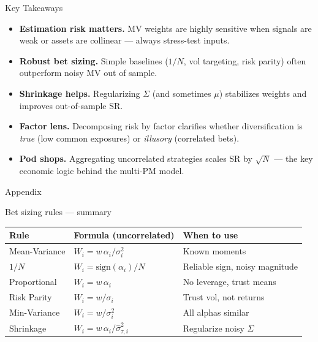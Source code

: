 \documentclass[aspectratio=169,10pt]{beamer}
\begin{document}

\begin{frame}{Key Takeaways}

\begin{itemize}
\item \textbf{Estimation risk matters.} MV weights are highly sensitive when signals are weak or assets are collinear --- always stress-test inputs.
\vskip 6pt
\item \textbf{Robust bet sizing.} Simple baselines ($1/N$, vol targeting, risk parity) often outperform noisy MV out of sample.
\vskip 6pt
\item \textbf{Shrinkage helps.} Regularizing $\Sigma$ (and sometimes $\mu$) stabilizes weights and improves out-of-sample SR.
\vskip 6pt
\item \textbf{Factor lens.} Decomposing risk by factor clarifies whether diversification is \textit{true} (low common exposures) or \textit{illusory} (correlated bets).
\vskip 6pt
\item \textbf{Pod shops.} Aggregating uncorrelated strategies scales SR by $\sqrt{N}$ --- the key economic logic behind the multi-PM model.
\end{itemize}

\end{frame}

\appendix
\begin{frame}
\begin{center}
{\Large Appendix}
\end{center}
\end{frame}

\begin{frame}{Bet sizing rules --- summary}

\small
\begin{center}
\begin{tabular}{lll}
\toprule
\textbf{Rule} & \textbf{Formula (uncorrelated)} & \textbf{When to use} \\
\midrule
Mean-Variance & $W_i = w \, \alpha_i / \sigma_i^2$ & Known moments \\
$1/N$ & $W_i = \text{sign}(\alpha_i)/N$ & Reliable sign, noisy magnitude \\
Proportional & $W_i = w \, \alpha_i$ & No leverage, trust means \\
Risk Parity & $W_i = w / \sigma_i$ & Trust vol, not returns \\
Min-Variance & $W_i = w / \sigma_i^2$ & All alphas similar \\
Shrinkage & $W_i = w \, \alpha_i / \hat{\sigma}_{\tau,i}^2$ & Regularize noisy $\Sigma$ \\
\bottomrule
\end{tabular}
\end{center}

\end{frame}
\end{document}
